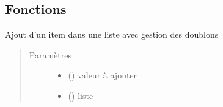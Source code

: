 \documentclass[letterpaper,10pt,french]{sphinxmanual}
\begin{document}
\subsection{Fonctions}
\label{\detokenize{modules/tools:fonctions}}

\begin{fulllineitems}
\label{\detokenize{modules/tools:toolbox.tools.add_list}}
Ajout d’un item dans une liste avec gestion des doublons
\begin{quote}\begin{description}
\item[{Paramètres}] \leavevmode\begin{itemize}
\item {} 
 () \textendash{} valeur à ajouter

\item {} 
 () \textendash{} liste

\end{itemize}

\end{description}\end{quote}

\end{fulllineitems}

\end{document}
